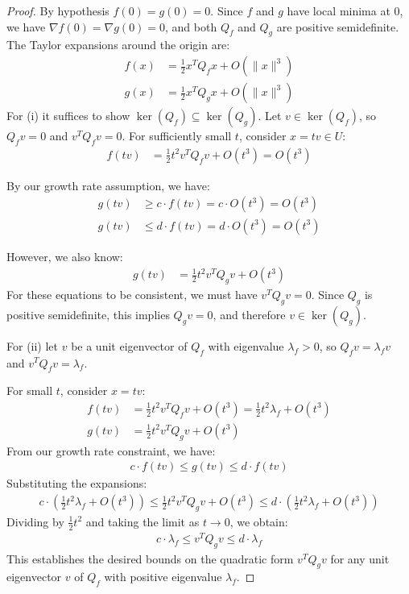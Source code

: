 \documentclass[english,letter paper,12pt,reqno]{article}
\theoremstyle{definition}
\begin{document}
\begin{proof}
By hypothesis $f(0) = g(0) = 0$. Since $f$ and $g$ have local minima at $0$, we have $\nabla f(0) = \nabla g(0) = 0$, and both $Q_f$ and $Q_g$ are positive semidefinite. The Taylor expansions around the origin are:
\begin{align}
f(x) &= \frac{1}{2}x^T Q_f x + O(\|x\|^3)\\
g(x) &= \frac{1}{2}x^T Q_g x + O(\|x\|^3)
\end{align}
For (i) it suffices to show $\ker(Q_f) \subseteq \ker(Q_g)$. Let $v \in \ker(Q_f)$, so $Q_f v = 0$ and $v^T Q_f v = 0$. For sufficiently small $t$, consider $x = tv \in U$:
\begin{align}
f(tv) &= \frac{1}{2}t^2 v^T Q_f v + O(t^3) = O(t^3)
\end{align}

By our growth rate assumption, we have:
\begin{align}
g(tv) &\geq c \cdot f(tv) = c \cdot O(t^3) = O(t^3)\\
g(tv) &\leq d \cdot f(tv) = d \cdot O(t^3) = O(t^3)
\end{align}

However, we also know:
\begin{align}
g(tv) &= \frac{1}{2}t^2 v^T Q_g v + O(t^3)
\end{align}
For these equations to be consistent, we must have $v^T Q_g v = 0$. Since $Q_g$ is positive semidefinite, this implies $Q_g v = 0$, and therefore $v \in \ker(Q_g)$.

For (ii) let $v$ be a unit eigenvector of $Q_f$ with eigenvalue $\lambda_f > 0$, so $Q_f v = \lambda_f v$ and $v^T Q_f v = \lambda_f$.

For small $t$, consider $x = tv$:
\begin{align}
f(tv) &= \frac{1}{2}t^2 v^T Q_f v + O(t^3) = \frac{1}{2}t^2 \lambda_f + O(t^3)\\
g(tv) &= \frac{1}{2}t^2 v^T Q_g v + O(t^3)
\end{align}
From our growth rate constraint, we have:
\begin{align}
c \cdot f(tv) \leq g(tv) \leq d \cdot f(tv)
\end{align}
Substituting the expansions:
\begin{align}
c \cdot \left(\frac{1}{2}t^2 \lambda_f + O(t^3)\right) \leq \frac{1}{2}t^2 v^T Q_g v + O(t^3) \leq d \cdot \left(\frac{1}{2}t^2 \lambda_f + O(t^3)\right)
\end{align}
Dividing by $\frac{1}{2}t^2$ and taking the limit as $t \to 0$, we obtain:
\begin{align}
c \cdot \lambda_f \leq v^T Q_g v \leq d \cdot \lambda_f
\end{align}
This establishes the desired bounds on the quadratic form $v^T Q_g v$ for any unit eigenvector $v$ of $Q_f$ with positive eigenvalue $\lambda_f$.
\end{proof}
\end{document}
